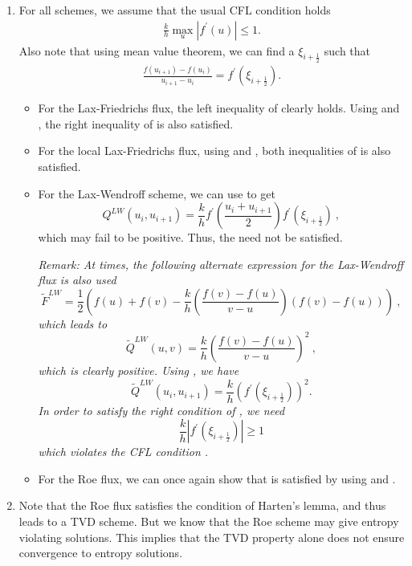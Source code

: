 \documentclass{article}
\newcommand{\iph}{{i + \frac{1}{2}}}
\newcommand{\ipo}{{i + 1}}
\begin{document}
\begin{exerciseList}
\begin{enumerate}
\item
For all schemes, we assume that the usual CFL condition holds
\begin{gather} \label{cfl}
\frac{k}{h} \max_u |f^\prime(u)| \leq 1.
\end{gather}
Also note that using mean value theorem, we can find a $\xi_\iph$ such that
\begin{gather} \label{mvt}
\frac{f(u_{i+1}) - f(u_i)}{u_{i+1} - u_i} = f^\prime(\xi_\iph).
\end{gather}
\begin{itemize}

\item For the Lax-Friedrichs flux, the left inequality of  clearly holds. Using  and , the right inequality of  is also satisfied. 

\item For the local Lax-Friedrichs flux, using  and , both inequalities of  is also satisfied. 

\item For the Lax-Wendroff scheme, we can use  to get
\[
Q^{LW}(u_i, u_{i+1} ) = \frac{k}{h} f^\prime\left( \frac{u_i+u_\ipo}{2}\right)f^\prime(\xi_\iph) \ ,
\]
which may fail to be positive. Thus, the  need not be satisfied.

\textit{
Remark: At times, the following alternate expression for the Lax-Wendroff flux is also used
\[
\widetilde{F}^{LW} = \frac{1}{2} \left( f(u) + f(v) - \frac{k}{h} \left(\frac{f(v) - f(u)}{v-u}\right)(f(v) - f(u))\right) \ ,
\]
which leads to
\[
\widetilde{Q}^{LW}(u,v) = \frac{k}{h} \left(\frac{f(v) - f(u)}{v-u}\right)^2 \ ,
\]
which is clearly positive. Using , we have
\[
\widetilde{Q}^{LW}(u_i, u_{i+1}) = \frac{k}{h} \left(f^\prime(\xi_\iph)\right)^2.
\]
In order to satisfy the right condition of , we need
\[
\frac{k}{h}| f^\prime(\xi_\iph)| \geq 1
\]
which violates the CFL condition .
}

\item For the Roe flux, we can once again show that  is satisfied by using  and .
\end{itemize}

\item Note that the Roe flux satisfies the condition of Harten's lemma, and thus leads to a TVD scheme. But we know that the Roe scheme may give entropy violating solutions. This implies that the TVD property alone does not ensure convergence to entropy solutions.


\end{enumerate}
\end{exerciseList}
\end{document}
